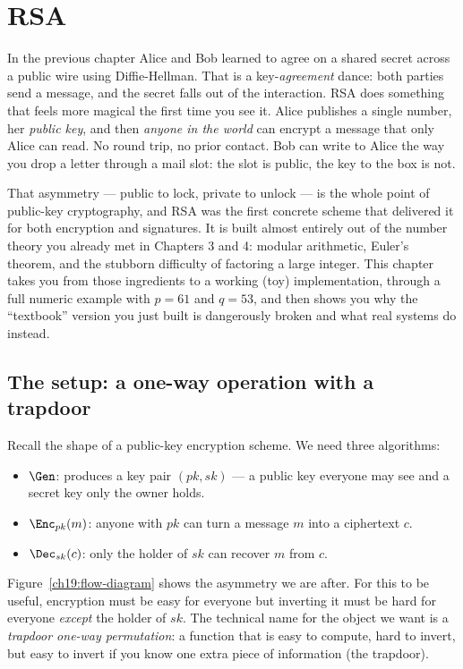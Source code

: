 \chapter{RSA}

In the previous chapter Alice and Bob learned to agree on a shared secret across a public wire using Diffie-Hellman. That is a key-\emph{agreement} dance: both parties send a message, and the secret falls out of the interaction. RSA does something that feels more magical the first time you see it. Alice publishes a single number, her \emph{public key}, and then \emph{anyone in the world} can encrypt a message that only Alice can read. No round trip, no prior contact. Bob can write to Alice the way you drop a letter through a mail slot: the slot is public, the key to the box is not.

That asymmetry --- public to lock, private to unlock --- is the whole point of public-key cryptography, and RSA was the first concrete scheme that delivered it for both encryption and signatures. It is built almost entirely out of the number theory you already met in Chapters 3 and 4: modular arithmetic, Euler's theorem, and the stubborn difficulty of factoring a large integer. This chapter takes you from those ingredients to a working (toy) implementation, through a full numeric example with $p=61$ and $q=53$, and then shows you why the ``textbook'' version you just built is dangerously broken and what real systems do instead.

\chapterline

\section{The setup: a one-way operation with a trapdoor}
\label{ch19:setup}

Recall the shape of a public-key encryption scheme. We need three algorithms:

\begin{itemize}
  \item $\Gen$: produces a key pair $(pk, sk)$ --- a public key everyone may see and a secret key only the owner holds.
  \item $\Enc_{pk}(m)$: anyone with $pk$ can turn a message $m$ into a ciphertext $c$.
  \item $\Dec_{sk}(c)$: only the holder of $sk$ can recover $m$ from $c$.
\end{itemize}

Figure~\ref{ch19:flow-diagram} shows the asymmetry we are after. For this to be useful, encryption must be easy for everyone but inverting it must be hard for everyone \emph{except} the holder of $sk$. The technical name for the object we want is a \emph{trapdoor one-way permutation}: a function that is easy to compute, hard to invert, but easy to invert if you know one extra piece of information (the trapdoor).

